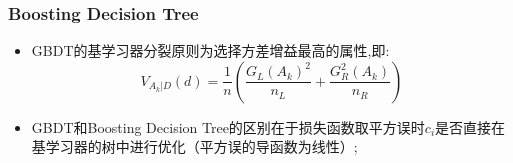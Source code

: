 \documentclass[usenames,dvipsnames]{beamer}
\begin{document}
\begin{frame}
\frametitle{Boosting Decision Tree}
\begin{itemize}
  \item GBDT的基学习器分裂原则为选择方差增益最高的属性,即:
        $$V_{A_k|D}(d) = \frac{1}{n}(\frac{G_L(A_k)^2}{n_L}+\frac{G_R^2(A_k)}{n_R})$$
  \item GBDT和Boosting Decision Tree的区别在于损失函数取平方误时$c_i$是否直接在基学习器的树中进行优化（平方误的导函数为线性）;
\end{itemize}
\end{frame}
\end{document}
